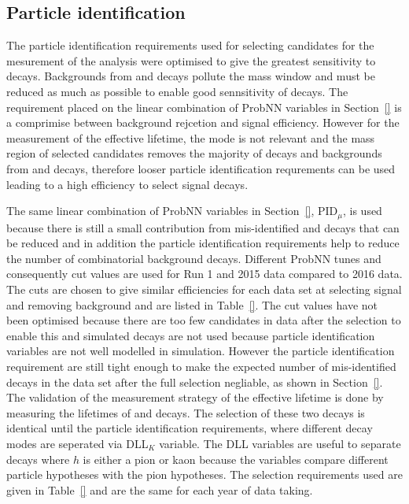 \subsection{Particle identification}
\label{sec:ELpid}
The particle identification requirements used for selecting candidates for the mesurement of the \BF analysis were optimised to give the greatest sensitivity to \bdmumu decays. Backgrounds from \bhh and \lambdab decays pollute the \bd mass window and must be reduced as much as possible to enable good sennsitivity of \bdmumu decays. The requirement placed on the linear combination of ProbNN variables in Section~\ref{} is a comprimise between background rejcetion and signal efficiency. However for the measurement of the \bsmumu effective lifetime, the \bd mode is not relevant and the mass region of selected candidates removes the majority of \bdmumu decays and backgrounds from \bhh and \lambda decays, therefore looser particle identification requrements can be used leading to a high efficiency to select signal decays.  

The same linear combination of ProbNN variables in Section~\ref{}, PID$_{\mu}$, is used because there is still a small contribution from mis-identified \bhh and \lambdab decays that can be reduced and in addition the particle identification requirements help to reduce the number of combinatorial background decays. Different ProbNN tunes and consequently cut values are used for Run 1 and 2015 data compared to 2016 data. The cuts are chosen to give similar efficiencies for each data set at selecting signal and removing background and are listed in Table~\ref{}. The cut values have not been optimised because there are too few candidates in data after the selection to enable this and simulated decays are not used because particle identification variables are not well modelled in simulation. However the particle identification requirement are still tight enough to make the expected number of mis-identified decays in the data set after the full selection negliable, as shown in Section~\ref{}. 
The validation of the measurement strategy of the \bsmumu effective lifetime is done by measuring the lifetimes of \bdkpi and \bskk decays. The selection of these two \bhh decays is identical until the particle identification requirements, where different decay modes are seperated via DLL$_{K}$ variable. The DLL variables are useful to separate \bhh decays where $h$ is either a pion or kaon because the variables compare different particle hypotheses with the pion hypotheses. The selection requirements used are given in Table~\ref{} and are the same for each year of data taking.


